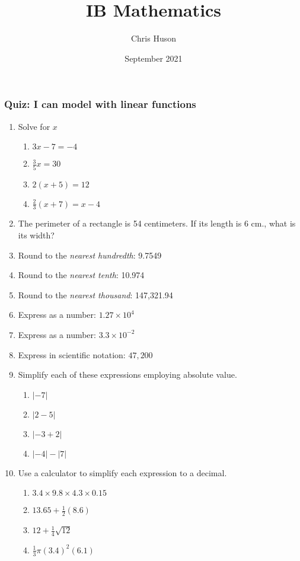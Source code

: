 \documentclass[12pt, twoside]{article}
\title{IB Mathematics}
\author{Chris Huson}
\date{September 2021}
\begin{document}
\subsubsection*{Quiz: I can model with linear functions}

\begin{enumerate}[itemsep=0.75cm]
  \item Solve for $x$
  \begin{multicols}{2}
    \begin{enumerate}[itemsep=3cm]
      \item $3x-7=-4$
      \item $\frac{3}{5}x =30$
      \item $2(x+5)=12$
      \item $\frac{2}{3}(x+7)=x-4$
    \end{enumerate}
  \end{multicols} \vspace{3cm}

  \item The perimeter of a rectangle is 54 centimeters. If its length is 6 cm., what is its width? \vspace{3cm}
  
  \item Round to the \emph{nearest hundredth}: 9.7549
  \item Round to the \emph{nearest tenth}: 10.974
  \item Round to the \emph{nearest thousand}: 147,321.94

  \item Express as a number: $1.27 \times 10^4$
  \item Express as a number: $3.3 \times 10^{-2}$
  \item Express in scientific notation: $47,200$
  
  \newpage
  \item Simplify each of these expressions employing absolute value.
  \begin{multicols}{2}
    \begin{enumerate}[itemsep=1.7cm]
      \item $|-7|$
      \item $|2-5|$
      \item $|-3+2|$
      \item $|-4|-|7|$
    \end{enumerate}
  \end{multicols}

  \item Use a calculator to simplify each expression to a decimal.
  \begin{multicols}{2}
  \begin{enumerate}[itemsep=1.5cm]
    \item $3.4 \times 9.8 \times 4.3 \times 0.15$ 
    \item $13.65 + \frac{1}{2} (8.6)$  
    \item $12 + \frac{1}{4} \sqrt{12}$
    \item $\frac{1}{3} \pi (3.4)^2(6.1)$
  \end{enumerate}
  \end{multicols}\vspace{0.5cm}


\end{enumerate}
\end{document}
